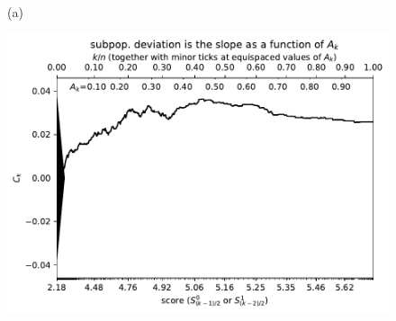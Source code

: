 \documentclass{article}
\newlength{\vertsep}
\newlength{\imsize}
\begin{document}
\begin{figure}
\begin{centering}

(a)
\parbox{\imsize}{\includegraphics[width=\imsize]
{../codes/weighted/County_of_San_Francisco_vs_San_Mateo-LNGI/cumulative.pdf}}

\vspace{\vertsep}


\end{centering}
\end{figure}
\end{document}
